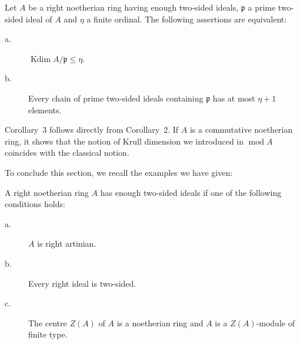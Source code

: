 \begin{corollary}
Let $A$ be a right noetherian ring having enough two-sided ideals,
$\mathfrak{p}$ a prime two-sided ideal of $A$ and $\eta$ a finite
ordinal. The following assertions are equivalent:
\begin{description}
\item[\normalfont a.] $\operatorname{Kdim} A/\mathfrak{p} \le \eta$.
\item[\normalfont b.] Every chain of prime two-sided ideals containing
  $\mathfrak{p}$ has at most $\eta + 1$ elements.
\end{description}
\end{corollary}

Corollary~3 follows directly from Corollary~2. If $A$ is a commutative
noetherian ring, it shows that the notion of Krull dimension we
introduced in $\operatorname{mod} A$ coincides with the classical notion.

To conclude this section, we recall the examples we have given:

\begin{proposition}
A right noetherian ring $A$ has enough two-sided ideals if one of the
following conditions holds:
\begin{description}
\item[\normalfont a.] $A$ is right artinian.
\item[\normalfont b.] Every right ideal is two-sided.
\item[\normalfont c.] The centre $Z(A)$ of $A$ is a noetherian ring and
  $A$ is a $Z(A)$-module of finite type.
\end{description}
\end{proposition}
